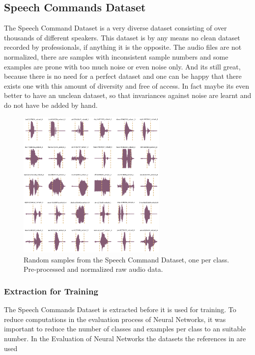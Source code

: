 
\subsection{Speech Commands Dataset}
The Speech Command Dataset \cite{warden2018} is a very diverse dataset consisting of over thousands of different speakers. This dataset is by any means no clean dataset recorded by professionals, if anything it is the opposite. 
The audio files are not normalized, there are samples with inconsistent sample numbers and some examples are prone with too much noise or even noise only.
And its still great, because there is no need for a perfect dataset and one can be happy that there exists one with this amount of diversity and free of access.
In fact maybe its even better to have an unclean dataset, so that invariances against noise are learnt and do not have be added by hand.

\begin{figure}[!ht]
  \centering
    \includegraphics[width=0.65\textwidth]{./4_practice/figs/a_dataset/wav_grid_c30}
  \caption{Random samples from the Speech Command Dataset, one per class. Pre-processed and normalized raw audio data.}
  \label{fig:wav_grid_c30}
\end{figure}
\FloatBarrier
\noindent

\subsubsection{Extraction for Training}
The Speech Commands Dataset is extracted before it is used for training. 
To reduce computations in the evaluation process of Neural Networks, it was important to reduce the number of classes and examples per class to an suitable number.
In the Evaluation of Neural Networks the datasets the references in  are used

